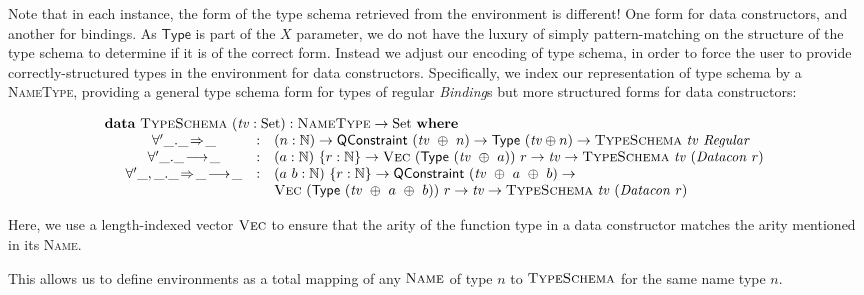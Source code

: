 \documentclass[a4paper]{jfp}
\begin{document}
Note that in each instance, the form of the type schema retrieved from the environment is different! One form for  data constructors, and another
for bindings. As $\textsf{Type}$ is part of the $X$ parameter, we do not have the luxury of simply pattern-matching on the structure of the type
schema to determine if it is of the correct form. Instead we adjust our encoding of type schema, in order to force the user to provide
correctly-structured types in the environment for data constructors. Specifically, we index our representation of type schema by a \textsc{NameType},
providing a general type schema form for types of regular \textit{Binding}s but more structured forms for data constructors:

\begin{displaymath}
   \begin{array}{l}
   \textbf{data}\ \textsc{TypeSchema}\ (\mathit{tv} : \text{Set}) : \textsc{NameType} \rightarrow \text{Set}\ \textbf{where} \\
   \quad\begin{array}{cll}
      \forall'\_.\_\!\Rightarrow\!\_ & : & (n : \mathbb{N}) \rightarrow \textsf{QConstraint}\ (\mathit{tv}\ \oplus\ n) \rightarrow \textsf{Type}\
      (\mathit{tv} \oplus n) \rightarrow \textsc{TypeSchema}\ \mathit{tv}\ \mathit{Regular} \\
      \forall'\_.\_\!\longrightarrow\!\_ & : & (a : \mathbb{N})\ \{r : \mathbb{N}\} \rightarrow \textsc{Vec}\ (\textsf{Type}\ (\mathit{tv}\ \oplus\ a))\ r
\rightarrow \mathit{tv} \rightarrow \textsc{TypeSchema}\ \mathit{tv}\ (\mathit{Datacon}\ r) \\
      \forall'\_,\_.\_\!\Rightarrow\!\_\!\longrightarrow\!\_ & : & (a\ b : \mathbb{N})\ \{r : \mathbb{N}\} \rightarrow \textsf{QConstraint}\ (\mathit{tv}\ \oplus\ a\ \oplus\ b) 
                 \rightarrow \\ & & \textsc{Vec}\ (\textsf{Type}\ (\mathit{tv}\ \oplus\ a\ \oplus\ b))\ r \rightarrow \mathit{tv} \rightarrow
           \textsc{TypeSchema}\ \mathit{tv}\ (\mathit{Datacon}\ r)
    \end{array}
        \end{array}
\end{displaymath}

Here, we use a length-indexed vector $\textsc{Vec}$ to ensure that the arity of the function type in a data constructor matches the arity mentioned in
its \textsc{Name}. 

This allows us to define environments as a total mapping of any $\textsc{Name}$ of type $n$ to $\textsc{TypeSchema}$ for the same name type $n$.
\end{document}
